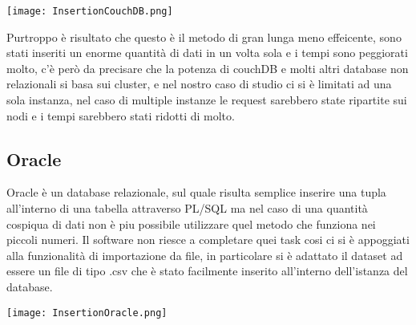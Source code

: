 \begin{center}
    \texttt{[image: InsertionCouchDB.png]}
\end{center}

Purtroppo è risultato che questo è il metodo di gran lunga meno effeicente, sono stati inseriti un enorme quantità di dati in un volta sola e i tempi sono
peggiorati molto, c'è però da precisare che la potenza di couchDB e molti altri database non relazionali si basa sui cluster, e nel nostro caso di studio
ci si è limitati ad una sola instanza, nel caso di multiple instanze le request sarebbero state ripartite sui nodi e i tempi sarebbero stati ridotti di molto.

\subsection{Oracle}

Oracle è un database relazionale, sul quale risulta semplice inserire una tupla all'interno di una tabella attraverso PL/SQL ma nel caso di una quantità
cospiqua di dati non è piu possibile utilizzare quel metodo che funziona nei piccoli numeri. Il software non riesce a completare quei task cosi ci si è 
appoggiati alla funzionalità di importazione da file, in particolare si è adattato il dataset ad essere un file di tipo .csv che è stato facilmente 
inserito all'interno dell'istanza del database.

\begin{center}
    \texttt{[image: InsertionOracle.png]}
\end{center}